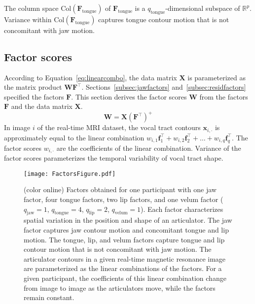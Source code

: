 \documentclass[preprint]{JASAnew}
\begin{document}
The column space $\mathrm{Col}(\mathbf{F}_\text{tongue})$ of $\mathbf{F}_\text{tongue}$ is a $q_\text{tongue}$-dimensional subspace of $\mathbb{R}^p$. 
%
Variance within $\mathrm{Col}(\mathbf{F}_\text{tongue})$ captures tongue contour motion that is not concomitant with jaw motion. 





\subsection{Factor scores}
\label{subsec:weights}

According to Equation~\ref{eq:linearcombo}, the data matrix $\mathbf{X}$ is parameterized as the matrix product $\mathbf{W}\mathbf{F}^\intercal$. 
%
Sections~\ref{subsec:jawfactors} and~\ref{subsec:residfactors} specified the factors $\mathbf{F}$. 
%
This section derives the factor scores $\mathbf{W}$ from the factors $\mathbf{F}$ and the data matrix $\mathbf{X}$. 
%
\begin{equation}
\mathbf{W} 
 = \mathbf{X} \left( \mathbf{F}^\intercal \right) ^+
\end{equation}
%
In image $i$ of the real-time MRI dataset, the vocal tract contours $\mathbf{x}_{i,\cdot}$ is approximately equal to the linear combination $w_{i,1} \mathbf{f}_1^\intercal + w_{i,2} \mathbf{f}_2^\intercal + \ldots + w_{i,q} \mathbf{f}_q^\intercal$. The factor scores $w_{i,\cdot }$ are the coefficients of the linear combination. Variance of the factor scores parameterizes the temporal variability of vocal tract shape. 

\begin{figure}

\texttt{[image: FactorsFigure.pdf]}

\caption{(color online) Factors obtained for one participant with one jaw factor, four tongue factors, two lip factors, and one velum factor ($q_\text{jaw} = 1$, $q_\text{tongue} = 4$, $q_\text{lip} = 2$, $q_\text{velum} = 1$). 
Each factor characterizes spatial variation in the position and shape of an articulator. 
The jaw factor captures jaw contour motion and concomitant tongue and lip motion.
The tongue, lip, and velum factors capture tongue and lip contour motion that is not concomitant with jaw motion. 
The articulator contours in a given real-time magnetic resonance image are parameterized as the linear combinations of the factors. 
For a given participant, the coefficients of this linear combination change from image to image as the articulators move, while the factors remain constant.}
\label{fig:gfa}
\end{figure}
\end{document}
